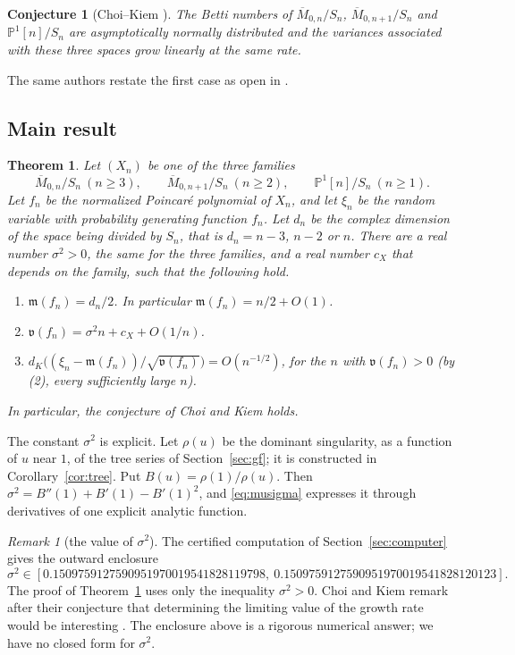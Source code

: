 \documentclass[11pt]{amsart}
\newtheorem{theorem}{Theorem}[section]
\newtheorem*{conjecture*}{Conjecture}
\theoremstyle{definition}
\theoremstyle{remark}
\newtheorem*{remark*}{Remark}
\numberwithin{equation}{section}
\newcommand{\Mbar}{\overline{M}}
\newcommand{\PP}{\mathbb{P}}
\newcommand{\mean}{\mathfrak{m}}
\newcommand{\var}{\mathfrak{v}}
\begin{document}
\begin{conjecture*}[Choi--Kiem {\cite[Conj.~5.2]{CK}}]
The Betti numbers of \(\Mbar_{0,n}/S_n\), \(\Mbar_{0,n+1}/S_n\) and \(\PP^1[n]/S_n\) are asymptotically normally distributed and the variances associated with these three spaces grow linearly at the same rate.
\end{conjecture*}

The same authors restate the first case as open in \cite[Conj.~3.9(2)]{CK2}.

\subsection{Main result}

\begin{theorem}\label{thm:main}
Let \((X_n)\) be one of the three families
\[
\Mbar_{0,n}/S_n\ (n\ge3),\qquad \Mbar_{0,n+1}/S_n\ (n\ge2),\qquad \PP^1[n]/S_n\ (n\ge1).
\]
Let \(f_n\) be the normalized Poincar\'e polynomial of \(X_n\), and let \(\xi_n\) be the random variable with probability generating function \(f_n\). Let \(d_n\) be the complex dimension of the space being divided by \(S_n\), that is \(d_n=n-3\), \(n-2\) or \(n\). There are a real number \(\sigma^2>0\), the same for the three families, and a real number \(c_X\) that depends on the family, such that the following hold.
\begin{enumerate}
\item \(\mean(f_n)=d_n/2\). In particular \(\mean(f_n)=n/2+O(1)\).
\item \(\var(f_n)=\sigma^2 n+c_X+O(1/n)\).
\item \(d_K\bigl((\xi_n-\mean(f_n))/\sqrt{\var(f_n)}\bigr)=O(n^{-1/2})\), for the \(n\) with \(\var(f_n)>0\) (by (2), every sufficiently large \(n\)).
\end{enumerate}
In particular, the conjecture of Choi and Kiem holds.
\end{theorem}

The constant \(\sigma^2\) is explicit. Let \(\rho(u)\) be the dominant singularity, as a function of \(u\) near \(1\), of the tree series of Section~\ref{sec:gf}; it is constructed in Corollary~\ref{cor:tree}. Put \(B(u)=\rho(1)/\rho(u)\). Then \(\sigma^2=B''(1)+B'(1)-B'(1)^2\), and \eqref{eq:musigma} expresses it through derivatives of one explicit analytic function.

\begin{remark*}[the value of \(\sigma^2\)]
The certified computation of Section~\ref{sec:computer} gives the outward enclosure
\[
\sigma^2\in[0.1509759127590951970019541828119798,\ 0.1509759127590951970019541828120123].
\]
The proof of Theorem~\ref{thm:main} uses only the inequality \(\sigma^2>0\). Choi and Kiem remark after their conjecture that determining the limiting value of the growth rate would be interesting \cite[\S5.1]{CK}. The enclosure above is a rigorous numerical answer; we have no closed form for \(\sigma^2\).
\end{remark*}
\end{document}
